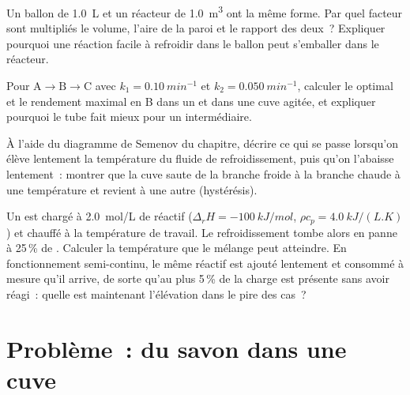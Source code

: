 \begin{exercise}[$\star\star$]\label{exo:b2:continuous-reactors:9}
Un ballon de \qty{1.0}{L} et un réacteur de \qty{1.0}{m^3} ont la même forme.
Par quel facteur sont multipliés le volume, l'aire de la paroi et le rapport des
deux~? Expliquer pourquoi une réaction facile à refroidir dans le ballon peut
s'emballer dans le réacteur.
\end{exercise}

\begin{exercise}[$\star\star\star$]\label{exo:b2:continuous-reactors:10}
Pour $\mathrm A \to \mathrm B \to \mathrm C$ avec $k_1 = \qty{0.10}{min^{-1}}$
et $k_2 = \qty{0.050}{min^{-1}}$, calculer le  optimal et le
rendement maximal en B dans un  et dans une cuve agitée, et expliquer
pourquoi le tube fait mieux pour un intermédiaire.
\end{exercise}

\begin{exercise}[$\star\star\star$]\label{exo:b2:continuous-reactors:11}
À l'aide du diagramme de Semenov du chapitre, décrire ce qui se passe lorsqu'on élève
lentement la température du fluide de refroidissement, puis qu'on l'abaisse lentement~: montrer que
la cuve saute de la branche froide à la branche chaude à une température et revient à
une autre (hystérésis).
\end{exercise}

\begin{exercise}[$\star\star\star$]\label{exo:b2:continuous-reactors:12}
Un  est chargé à \qty{2.0}{mol/L} de réactif ($\Delta_r H =
\qty{-100}{kJ/mol}$, $\rho c_p = \qty{4.0}{kJ/(L.K)}$) et chauffé à la
température de travail. Le refroidissement tombe alors en panne à 25\,\% de . Calculer la
température que le mélange peut atteindre. En fonctionnement semi-continu, le même
réactif est ajouté lentement et consommé à mesure qu'il arrive, de sorte qu'au plus 5\,\%
de la charge est présente sans avoir réagi~: quelle est maintenant l'élévation dans le pire des cas~?
\end{exercise}

\section{Problème~: du savon dans une cuve}

